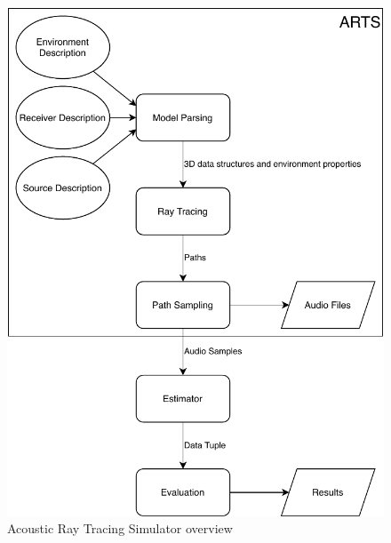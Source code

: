 \begin{figure}[H]
    \begin{center}
    \includegraphics[width=\textwidth]{figures/approach/figOverview.pdf}
    \end{center}
    \caption[Acoustic Ray Tracing Simulator overview]{Acoustic Ray Tracing Simulator overview}
    \label{fig:overview}
\end{figure}
